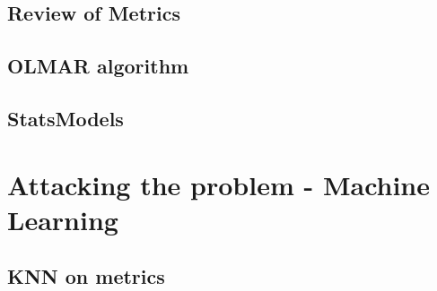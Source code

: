 \documentclass[a4paper,11pt]{article}
\begin{document}
\subsection{Review of Metrics}
\subsection{OLMAR algorithm}
\subsection{StatsModels}

\section{Attacking the problem - Machine Learning}
\subsection{KNN on metrics}

\cite {website:pybrain-tutorial}



\end{document}
